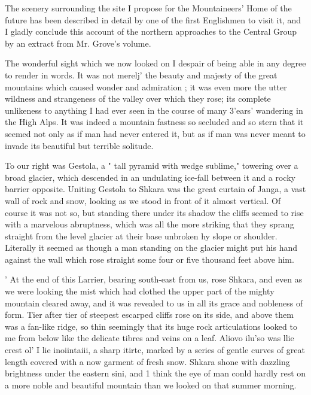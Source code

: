 \documentclass[25pt, a4paper]{article}
\begin{document}
The scenery surrounding the site I propose for the Mountaineers' Home of the future has been described in detail by one of the first Englishmen to visit it, and I gladly conclude this account of the northern approaches to the Central Group by an extract from Mr. Grove's volume.

The wonderful sight which we now looked on I despair of being able in any degree to render in words. It was not merelj' the beauty and majesty of the great mountains which caused wonder and admiration ; it was even more the utter wildness and strangeness of the valley over which they rose; its complete unlikeness to anything I had ever seen in the course of many 3'ears' wandering in the High Alps. It was indeed a mountain fastness so secluded and so stern that it seemed not only as if man had never entered it, but as if man was never meant to invade its beautiful but terrible solitude.

To our right was Gestola, a " tall pyramid with wedge sublime," towering over a broad glacier, which descended in an undulating ice-fall between it and a rocky barrier opposite. Uniting Gestola to Shkara was the great curtain of Janga, a vast wall of rock and snow, looking as we stood in front of it almost vertical. Of course it was not so, but standing there under its shadow the cliffs seemed to rise with a marvelous abruptness, which was all the more striking that they sprang straight from the level glacier at their base unbroken hy slope or shoulder. Literally it seemed as though a man standing on the glacier might put his hand against the wall which rose straight some four or five thousand feet above him.

' At the end of this Larrier, bearing south-east from us, rose Shkara, and even as we were looking the mist which had clothed the upper part of the mighty mountain cleared away, and it was revealed to us in all its grace and nobleness of form. Tier after tier of steepest escarped cliffs rose on its side, and above them was a fan-like ridge, so thin seemingly that its huge rock articulations looked to me from below like the delicate tibres and veins on a leaf. Aliovo ilu'so was llie crest ol' I lie inoiintaiii, a sharp itirtc, marked by a series of gentle curves of great length eovcred with a now garment of fresh snow. Shkara shone with dazzling brightness under the eastern sini, and 1 think the eye of man conld hardly rest on a more noble and beautiful mountain than we looked on that summer morning.
\end{document}
